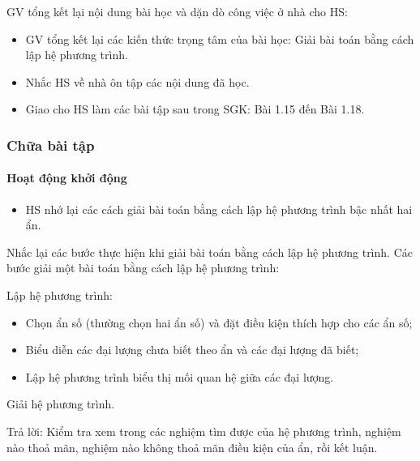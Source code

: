 GV tổng kết lại nội dung bài học và dặn dò công việc ở nhà cho HS:

\begin{itemize}
	\item GV tổng kết lại các kiến thức trọng tâm của bài học: Giải bài toán bằng cách lập hệ phương trình.
	\item Nhắc HS về nhà ôn tập các nội dung đã học.
	\item Giao cho HS làm các bài tập sau trong SGK: Bài 1.15 đến Bài 1.18.
\end{itemize}

\subsubsection{Chữa bài tập}

\paragraph{Hoạt động khởi động}

\muctieu

\begin{itemize}
	\item HS nhớ lại các cách giải bài toán bằng cách lập hệ phương trình bậc nhất hai ẩn.
\end{itemize}

\noidungsanpham

\begin{ontap}
	Nhắc lại các bước thực hiện khi giải bài toán bằng cách lập hệ phương trình.
	\doicot
	Các bước giải một bài toán bằng cách lập hệ phương trình:
	\begin{cacbuoc}
		\item Lập hệ phương trình:
		\begin{itemize}
			\item Chọn ẩn số (thường chọn hai ẩn số) và đặt điều kiện thích hợp cho các ẩn số;
			\item Biểu diễn các đại lượng chưa biết theo ẩn và các đại lượng đã biết;
			\item Lập hệ phương trình biểu thị mối quan hệ giữa các đại lượng.
		\end{itemize}
		\item Giải hệ phương trình.
		\item Trả lời: Kiểm tra xem trong các nghiệm tìm được của hệ phương trình, nghiệm nào thoả mãn, nghiệm nào không thoả mãn điều kiện của ẩn, rồi kết luận.
	\end{cacbuoc}
\end{ontap}

